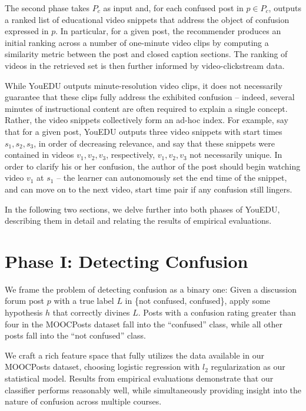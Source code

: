 \documentclass{edm_template}
\begin{document}
The second phase takes $P_{c}$ as input and, for each confused post in $p \in P_{c}$, outputs a ranked list of educational video snippets that address the object of confusion expressed in $p$. In particular, for a given post, the recommender produces an initial ranking across a number of one-minute video clips by computing a similarity metric between the post and closed caption sections. The ranking of videos in the retrieved set is then further informed by video-clickstream data.

While YouEDU outputs minute-resolution video clips, it does not necessarily guarantee that these clips fully address the exhibited confusion -- indeed, several minutes of instructional content are often required to explain a single concept. Rather, the video snippets collectively form an ad-hoc index. For example, say that for a given post, YouEDU outputs three video snippets with start times $s_{1}, s_{2}, s_{3}$, in order of decreasing relevance, and say that these snippets were contained in videos $v_{1}, v_{2}, v_{3}$, respectively, $v_{1}, v_{2}, v_{3}$ not necessarily unique. In order to clarify his or her confusion, the author of the post should begin watching video $v_{1}$ at $s_{1}$ -- the learner can autonomously set the end time of the snippet, and can move on to the next video, start time pair if any confusion still lingers. 

In the following two sections, we delve further into both phases of YouEDU, describing them in detail and relating the results of empirical evaluations.

\section{Phase I: Detecting Confusion}
\label{sec:confusionDetection}

We frame the problem of detecting confusion as a binary one: Given a discussion forum post $p$ with a true label $L$ in \{not confused, confused\}, apply some hypothesis $h$ that correctly divines $L$. Posts with a confusion rating greater than four in the MOOCPosts dataset fall into the ``confused'' class, while all other posts fall into the ``not confused'' class.

We craft a rich feature space that fully utilizes the data available in our MOOCPosts dataset, choosing logistic regression with $l_{2}$ regularization as our statistical model. Results from empirical evaluations demonstrate that our classifier performs reasonably well, while simultaneously providing insight into the nature of confusion across multiple courses.
\end{document}
